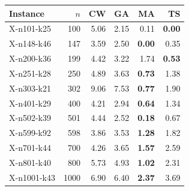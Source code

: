\begin{tabular}{@{}l r r r r r@{}}
\toprule
Instance & $n$ & CW & GA & MA & TS \\
\midrule
X-n101-k25 & 100 & 5.06 & 2.15 & 0.11 & \textbf{0.00} \\
X-n148-k46 & 147 & 3.59 & 2.50 & \textbf{0.00} & 0.35 \\
X-n200-k36 & 199 & 4.42 & 3.22 & 1.74 & \textbf{0.53} \\
X-n251-k28 & 250 & 4.89 & 3.63 & \textbf{0.73} & 1.38 \\
X-n303-k21 & 302 & 9.06 & 7.53 & \textbf{0.77} & 1.90 \\
X-n401-k29 & 400 & 4.21 & 2.94 & \textbf{0.64} & 1.34 \\
X-n502-k39 & 501 & 4.44 & 2.52 & \textbf{0.18} & 0.67 \\
X-n599-k92 & 598 & 3.86 & 3.53 & \textbf{1.28} & 1.82 \\
X-n701-k44 & 700 & 4.26 & 3.65 & \textbf{1.57} & 2.59 \\
X-n801-k40 & 800 & 5.73 & 4.93 & \textbf{1.02} & 2.31 \\
X-n1001-k43 & 1000 & 6.90 & 6.40 & \textbf{2.37} & 3.69 \\
\bottomrule
\end{tabular}
